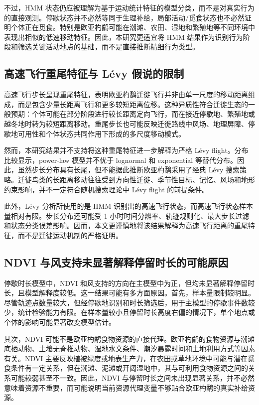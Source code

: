 \documentclass[UTF8,a4paper,12pt]{ctexart}
\begin{document}
不过，HMM 状态仍应被理解为基于运动统计特征的模型分类，而不是对真实行为的直接观测。停歇状态并不必然等同于生理补给，局部活动/觅食状态也不必然证明个体正在觅食。特别是欧亚杓鹬可能在潮滩、农田、湿地和繁殖地等不同环境中表现出相似的低速移动特征。因此，本研究更适宜将 HMM 结果作为识别行为阶段和筛选关键活动地点的基础，而不是直接推断精细行为类型。

\subsection{高速飞行重尾特征与 L\'evy 假说的限制}

高速飞行步长呈现重尾特征，表明欧亚杓鹬迁徙飞行并非由单一尺度的移动距离组成，而是包含少量长距离飞行和更多较短距离位移。这种异质性符合迁徙生态的一般预期：个体可能在部分阶段进行较长距离定向飞行，而在接近停歇地、繁殖地或越冬地时转为较短距离移动。重尾步长也可能反映迁徙路线中风场、地理屏障、停歇地可用性和个体状态共同作用下形成的多尺度移动模式。

然而，本研究结果并不支持将这种重尾特征进一步解释为严格 L\'evy flight。分布比较显示，power-law 模型并不优于 lognormal 和 exponential 等替代分布。因此，虽然步长分布具有长尾，但不能据此推断欧亚杓鹬采用了经典 L\'evy 搜索策略。迁徙鸟类的长距离移动往往受到方向性迁徙、季节性目标、记忆、风场和地形约束影响，并不一定符合随机搜索理论中 L\'evy flight 的前提条件。

此外，L\'evy 分析所使用的是 HMM 识别出的高速飞行状态，而高速飞行状态样本量相对有限。步长分布还可能受 1 小时时间分辨率、轨迹规则化、最大步长过滤和状态分类误差影响。因而，本文更谨慎地将该结果解释为高速飞行距离的重尾特征，而不是迁徙运动机制的严格证明。

\subsection{NDVI 与风支持未显著解释停留时长的可能原因}

停歇时长模型中，NDVI 和风支持的方向在主模型中为正，但均未显著解释停留时长，且模型解释度较低。这一结果可能有多方面原因。首先，样本量限制较明显。尽管轨迹点数量较大，但经停歇地识别和时长筛选后，用于主模型的停歇事件数较少，统计检验能力有限。在样本量较小且停留时长高度右偏的情况下，单个地点或个体的影响可能显著改变模型估计。

其次，NDVI 可能不是欧亚杓鹬食物资源的直接代理。欧亚杓鹬的食物资源与潮滩底栖动物、土壤无脊椎动物、湿地水文条件、潮汐暴露时间和土地利用方式等因素有关。NDVI 主要反映植被绿度或地表生产力，在农田或草地环境中可能与潜在觅食条件有一定关系，但在潮滩、泥滩或开阔湿地中，其与可利用食物资源之间的关系可能较弱甚至不一致。因此，NDVI 与停留时长之间未出现显著关系，并不必然意味着资源不重要，而可能说明当前资源代理变量不够贴合欧亚杓鹬的真实补给资源。
\end{document}
